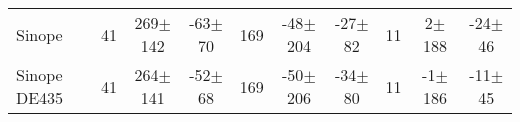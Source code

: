 \documentclass[11pt,a4paper]{report}
\begin{document}
\begin{landscape}
\begin{table*}
\begin{centering}
\begin{tabular}{l|ccc|ccc|ccc}
\hdashline
Sinope  & 41 & 269$\pm$142 & -63$\pm$ 70 & 169 & -48$\pm$204 & -27$\pm$ 82 & 11 &   2$\pm$188 & -24$\pm$ 46\tabularnewline
Sinope DE435 & 41 & 264$\pm$141 & -52$\pm$ 68 & 169 & -50$\pm$206 & -34$\pm$ 80 & 11 &  -1$\pm$186 & -11$\pm$ 45 \tabularnewline
\hline
\end{tabular}
\par \end{centering}
\end{table*}

\end{landscape}
\end{document}
